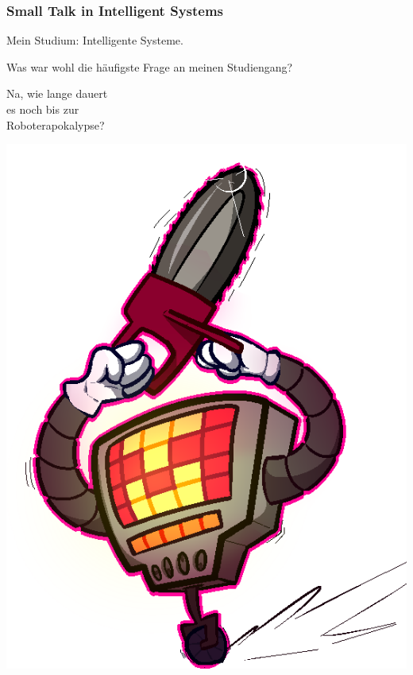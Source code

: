 \documentclass[aspectratio=43,x11names]{beamer}
\begin{document}

\begin{frame}
\frametitle{Small Talk in Intelligent Systems}

\begin{multicols}{2}

Mein Studium: \glqq Intelligente Systeme\grqq .

Was war wohl die häufigste Frage an meinen Studiengang?

\pause

\begin{center}
\glqq Na, wie lange dauert\\ es noch bis zur\\ Roboterapokalypse?\grqq
\end{center}

\columnbreak

\begin{center}
\includegraphics[height=0.7\textheight,keepaspectratio]{images/mtt.png} 
\end{center}
\end{multicols}
\end{frame}
\end{document}
